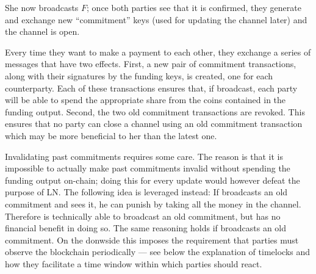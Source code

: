     She now broadcasts $F$; once both parties see that it is confirmed, they
    generate and exchange new ``commitment'' keys (used for updating the channel
    later) and the channel is open.

    Every time they want to make a payment to each other, they exchange a series
    of messages that have two effects. First, a new pair of commitment
    transactions, along with their signatures by the funding keys, is created,
    one for each counterparty. Each of these transactions ensures that, if
    broadcast, each party will be able to spend the appropriate share from the
    coins contained in the funding output. Second, the two old commitment
    transactions are revoked. This ensures that no party can close a channel
    using an old commitment transaction which may be more beneficial to her than
    the latest one.

    Invalidating past commitments requires some care. The reason is that it is
    impossible to actually make past commitments invalid without spending the
    funding output on-chain; doing this for every update would however defeat
    the purpose of LN. The following idea is leveraged instead: If \alice{}
    broadcasts an old commitment and \bob{} sees it, he can punish \alice{} by
    taking all the money in the channel. Therefore \alice{} is technically able
    to broadcast an old commitment, but has no financial benefit in doing so.
    The same reasoning holds if \bob{} broadcasts an old commitment. On the
    donwside this imposes the requirement that parties must observe the
    blockchain periodically --- see below the explanation of timelocks and how
    they facilitate a time window within which parties should react.

